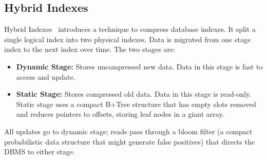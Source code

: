 \documentclass[11pt]{article}
\begin{document}
\subsection*{Hybrid Indexes}
Hybrid Indexes~\cite{Zhang} introduces a technique to compress database indexes. It split a single logical index into two physical indexes. Data is migrated from one stage index to the next index over time. The two stages are:
\begin{itemize}
    \item \textbf{Dynamic Stage:} Stores uncompressed new data. Data in this stage is fast to access and update.
    \item \textbf{Static Stage:} Stores compressed old data. Data in this stage is read-only. Static stage uses a compact B+Tree structure that has empty slots removed and reduces pointers to offsets, storing leaf nodes in a giant array.
\end{itemize}
All updates go to dynamic stage; reads pass through a bloom filter (a compact probabilistic data structure that might generate false positives) that directs the DBMS to either stage.

\newpage


\end{document}
